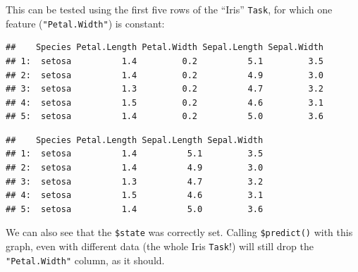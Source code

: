 \documentclass[]{scrbook}
\newenvironment{Shaded}{\begin{snugshade}}{\end{snugshade}}
\newcommand{\DecValTok}[1]{\textcolor[rgb]{0.00,0.00,0.81}{#1}}
\newcommand{\KeywordTok}[1]{\textcolor[rgb]{0.13,0.29,0.53}{\textbf{#1}}}
\newcommand{\NormalTok}[1]{#1}
\newcommand{\OperatorTok}[1]{\textcolor[rgb]{0.81,0.36,0.00}{\textbf{#1}}}
\newcommand{\StringTok}[1]{\textcolor[rgb]{0.31,0.60,0.02}{#1}}
\renewenvironment{Shaded} {\begin{snugshade}\small} {\end{snugshade}}
\begin{document}
This can be tested using the first five rows of the ``Iris'' \texttt{Task}, for which one feature (\texttt{"Petal.Width"}) is constant:

\begin{Shaded}
\end{Shaded}

\begin{verbatim}
##    Species Petal.Length Petal.Width Sepal.Length Sepal.Width
## 1:  setosa          1.4         0.2          5.1         3.5
## 2:  setosa          1.4         0.2          4.9         3.0
## 3:  setosa          1.3         0.2          4.7         3.2
## 4:  setosa          1.5         0.2          4.6         3.1
## 5:  setosa          1.4         0.2          5.0         3.6
\end{verbatim}

\begin{Shaded}
\end{Shaded}

\begin{verbatim}
##    Species Petal.Length Sepal.Length Sepal.Width
## 1:  setosa          1.4          5.1         3.5
## 2:  setosa          1.4          4.9         3.0
## 3:  setosa          1.3          4.7         3.2
## 4:  setosa          1.5          4.6         3.1
## 5:  setosa          1.4          5.0         3.6
\end{verbatim}

We can also see that the \texttt{\$state} was correctly set. Calling \texttt{\$predict()} with this graph, even with different data (the whole Iris \texttt{Task}!) will still drop the \texttt{"Petal.Width"} column, as it should.
\end{document}
